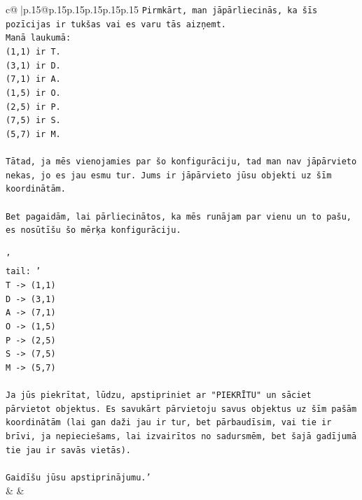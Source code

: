 \documentclass{article}
\begin{document}
{\begin{supertabular}{c@{$\;$}|p{.15\linewidth}@{}p{.15\linewidth}p{.15\linewidth}p{.15\linewidth}p{.15\linewidth}p{.15\linewidth}}
{{{\texttt{Pirmkārt, man jāpārliecinās, ka šīs pozīcijas ir tukšas vai es varu tās aizņemt.} \\
\texttt{Manā laukumā:} \\
\texttt{(1,1) ir T.} \\
\texttt{(3,1) ir D.} \\
\texttt{(7,1) ir A.} \\
\texttt{(1,5) ir O.} \\
\texttt{(2,5) ir P.} \\
\texttt{(7,5) ir S.} \\
\texttt{(5,7) ir M.} \\
\\ 
\texttt{Tātad, ja mēs vienojamies par šo konfigurāciju, tad man nav jāpārvieto nekas, jo es jau esmu tur. Jums ir jāpārvieto jūsu objekti uz šīm koordinātām.} \\
\\ 
\texttt{Bet pagaidām, lai pārliecinātos, ka mēs runājam par vienu un to pašu, es nosūtīšu šo mērķa konfigurāciju.} \\
\\ 
\texttt{'} \\
\texttt{tail: '} \\
\texttt{T {-}> (1,1)} \\
\texttt{D {-}> (3,1)} \\
\texttt{A {-}> (7,1)} \\
\texttt{O {-}> (1,5)} \\
\texttt{P {-}> (2,5)} \\
\texttt{S {-}> (7,5)} \\
\texttt{M {-}> (5,7)} \\
\\ 
\texttt{Ja jūs piekrītat, lūdzu, apstipriniet ar "PIEKRĪTU" un sāciet pārvietot objektus. Es savukārt pārvietoju savus objektus uz šīm pašām koordinātām (lai gan daži jau ir tur, bet pārbaudīsim, vai tie ir brīvi, ja nepieciešams, lai izvairītos no sadursmēm, bet šajā gadījumā tie jau ir savās vietās).} \\
\\ 
\texttt{Gaidīšu jūsu apstiprinājumu.'} \\
            }
        }
    }
    & & \\ \\


\end{supertabular}}
\end{document}
